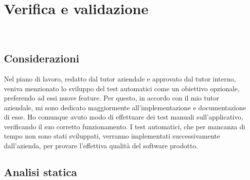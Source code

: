 
\chapter{Verifica e validazione}
\label{cap:verifica-validazione}

\\

\section{Considerazioni}
\label{sec:considerazioni}

Nel piano di lavoro, redatto dal tutor aziendale e approvato dal tutor interno, veniva menzionato lo sviluppo del test automatici come un obiettivo opzionale, preferendo ad essi nuove feature. Per questo, in accordo con il mio tutor aziendale, mi sono dedicato maggiormente all’implementazione e documentazione di esse. Ho comunque avuto modo di effettuare dei test manuali sull’applicativo, verificando il suo corretto funzionamento. I test automatici, che per mancanza di tempo non sono stati sviluppati, verranno implementati successivamente dall’azienda, per provare l’effettiva qualità del software prodotto.

\section{Analisi statica}


